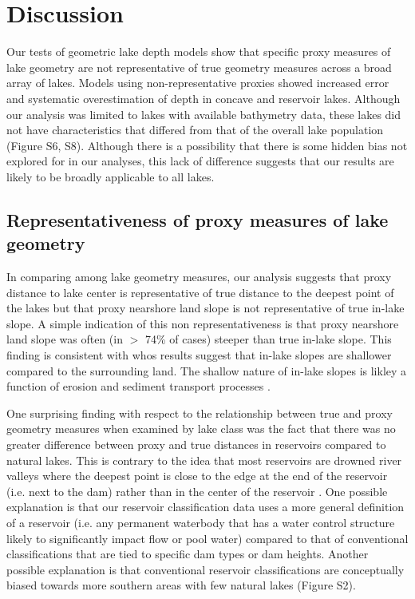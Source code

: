 \documentclass[draft]{agujournal2019}
\begin{document}
\section{Discussion}
\noindent
Our tests of geometric lake depth models show that specific proxy measures of lake geometry are not representative of true geometry measures across a broad array of lakes. Models using non-representative proxies showed increased error and systematic overestimation of depth in concave and reservoir lakes. Although our analysis was limited to lakes with available bathymetry data, these lakes did not have characteristics that differed from that of the overall lake population (Figure S6, S8). Although there is a possibility that there is some hidden bias not explored for in our analyses, this lack of difference suggests that our results are likely to be broadly applicable to all lakes.

\subsection{Representativeness of proxy measures of lake geometry}
\noindent
In comparing among lake geometry measures, our analysis suggests that proxy distance to lake center is representative of true distance to the deepest point of the lakes but that proxy nearshore land slope is not representative of true in-lake slope. A simple indication of this non representativeness is that proxy nearshore land slope was often (in $>$ 74\% of cases) steeper than true in-lake slope. This finding is consistent with  whos results suggest that in-lake slopes are shallower compared to the surrounding land. The shallow nature of in-lake slopes is likley a function of erosion and sediment transport processes \cite{hakansonLakeBottomDynamics1981, johanssonNewApproachesModelling2007}.

One surprising finding with respect to the relationship between true and proxy geometry measures when examined by lake class was the fact that there was no greater difference between proxy and true distances in reservoirs compared to natural lakes. This is contrary to the idea that most reservoirs are drowned river valleys where the deepest point is close to the edge at the end of the reservoir (i.e. next to the dam) rather than in the center of the reservoir \cite{lanza1985interactions}. One possible explanation is that our reservoir classification data uses a more general definition of a reservoir (i.e. any permanent waterbody that has a water control structure likely to significantly impact flow or pool water) compared to that of conventional classifications that are tied to specific dam types or dam heights. Another possible explanation is that conventional reservoir classifications are conceptually biased towards more southern areas with few natural lakes (Figure S2).
\end{document}
